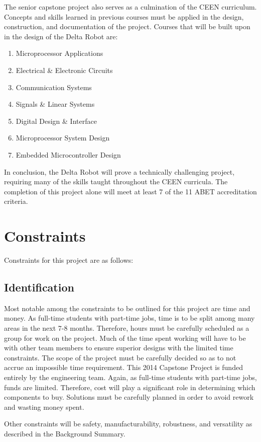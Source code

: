The senior capstone project also serves as a culmination of the CEEN curriculum. Concepts and skills learned in previous courses must be applied in the design, construction, and documentation of the project.
Courses that will be built upon in the design of the Delta Robot are:
\begin{enumerate} \parskip2pt
	\item Microprocessor Applications
	\item Electrical \& Electronic Circuits
	\item Communication Systems
	\item Signals \& Linear Systems
	\item Digital Design \& Interface
	\item Microprocessor System Design
	\item Embedded Microcontroller Design
\end{enumerate}

In conclusion, the Delta Robot will prove a technically challenging project, requiring many of the skills taught throughout the CEEN curricula.
The completion of this project alone will meet at least 7 of the 11 ABET accreditation criteria.

\section{Constraints}	
Constraints for this project are as follows:

\subsection{Identification}
Most notable among the constraints to be outlined for this project are time and money.
As full-time students with part-time jobs, time is to be split among many areas in the next 7-8 months.
Therefore, hours must be carefully scheduled as a group for work on the project.
Much of the time spent working will have to be with other team members to ensure superior designs with the limited time constraints.
The scope of the project must be carefully decided so as to not accrue an impossible time requirement. 
This 2014 Capstone Project is funded entirely by the engineering team. 
Again, as full-time students with part-time jobs, funds are limited.
Therefore, cost will play a significant role in determining which components to buy.
Solutions must be carefully planned in order to avoid rework and wasting money spent.

Other constraints will be safety, manufacturability, robustness, and versatility as described in the Background Summary.

